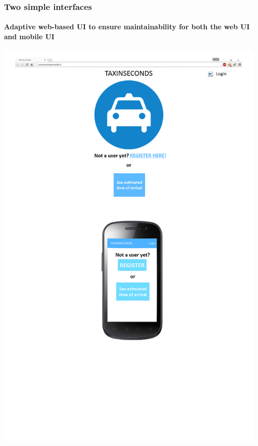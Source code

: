 \documentclass[10pt,xcolor={usenames,dvipsnames}]{beamer}
\begin{document}
\begin{frame}
	\frametitle{Two simple interfaces}
	\framesubtitle{Adaptive web-based UI to ensure maintainability for both the web UI and mobile UI}
	\begin{center}
		\includegraphics[width=\textwidth,height=\textheight,keepaspectratio]{GuestInterface}
	\end{center}
\end{frame}
\end{document}
